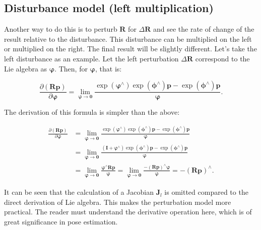 \subsection{Disturbance model (left multiplication)}

Another way to do this is to perturb $\bm{R}$ for $\Delta \bm{R}$ and see the rate of change of the result relative to the disturbance. This disturbance can be multiplied on the left or multiplied on the right. The final result will be slightly different. Let's take the left disturbance as an example. Let the left perturbation $\Delta \bm{R}$ correspond to the Lie algebra as $\boldsymbol{\varphi}$. Then, for $\boldsymbol{\varphi}$, that is:

\begin{equation}
\frac{{\partial \left( {\bm{Rp}} \right)}}{{\partial \boldsymbol{\varphi} }} = \mathop {\lim }\limits_{\boldsymbol{\varphi}  \to \bm{0}} \frac{{\exp \left( {{\boldsymbol{\varphi} ^ \wedge }} \right)\exp \left( {{\boldsymbol{\phi} ^ \wedge }} \right)\bm{p} - \exp \left( {{\boldsymbol{\phi} ^ \wedge }} \right)\bm{p}}}{\boldsymbol{\varphi} }.
\end{equation}

The derivation of this formula is simpler than the above:

\begin{align*}
\frac{{\partial \left( {\bm{Rp}} \right)}}{{\partial \boldsymbol{\varphi} }} &= \mathop {\lim }\limits_{\boldsymbol{\varphi}  \to \bm{0}} \frac{{\exp \left( {{\boldsymbol{\varphi} ^ \wedge }} \right)\exp \left( {{\boldsymbol{\phi} ^ \wedge }} \right)\bm{p} - \exp \left( {{\boldsymbol{\phi} ^ \wedge }} \right)\bm{p}}}{ \boldsymbol{\varphi} }\\
&= \mathop {\lim }\limits_{\boldsymbol{\varphi } \to \bm{0}} \frac{{\left( {\bm{I} + {\boldsymbol{\varphi }^ \wedge }} \right)\exp \left( {{\boldsymbol{\phi} ^ \wedge }} \right)\bm{p} - \exp \left( {{\boldsymbol{\phi} ^ \wedge }} \right)\bm{p}}}{\boldsymbol{\varphi} }\\
&= \mathop {\lim }\limits_{\boldsymbol{\varphi}  \to \bm{0}} \frac{{{\boldsymbol{\varphi} ^ \wedge }\bm{Rp}}}{\boldsymbol{\varphi} } = \mathop {\lim }\limits_{\boldsymbol{\varphi}  \to \bm{0}} \frac{{ - {{\left( \bm{Rp} \right)}^ \wedge }\boldsymbol{\varphi} }}{\boldsymbol{\varphi} } =  - {\left( \bm{Rp} \right)^ \wedge }.
\end{align*}

It can be seen that the calculation of a Jacobian $\bm{J}_l$ is omitted compared to the direct derivation of Lie algebra. This makes the perturbation model more practical. The reader must understand the derivative operation here, which is of great significance in pose estimation.